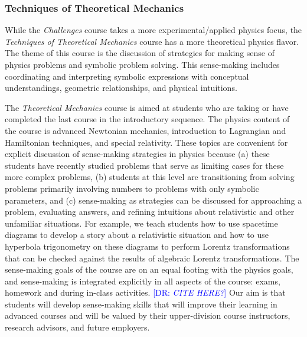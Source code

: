 \documentclass[english,aps,pra,reprint,noshowpacs,superscriptaddress]{revtex4-1}
\newcommand\davidsays[1]{\textcolor{blue}{[\sc DR: {\em#1}]}}
\begin{document}

\subsubsection{Techniques of Theoretical Mechanics}

While the \emph{Challenges} course takes a more experimental/applied physics
focus, the \emph{Techniques of Theoretical Mechanics} course has a more
theoretical physics flavor. The theme of this course is the discussion
of strategies for making sense of physics problems and symbolic
problem solving. This sense-making includes coordinating and
interpreting symbolic expressions with conceptual understandings,
geometric relationships, and physical intuitions.

The \emph{Theoretical Mechanics} course is aimed at students who are taking
or have completed the last course in the introductory sequence. The
physics content of the course is advanced Newtonian mechanics,
introduction to Lagrangian and Hamiltonian techniques, and special
relativity. These topics are convenient
for explicit discussion of sense-making strategies in physics because
(a) these students have recently studied problems that serve as limiting
cases for these more complex problems, (b) students at this level are
transitioning from solving problems primarily involving numbers to
problems with only symbolic parameters, and (c) sense-making as strategies 
can be discussed for approaching a problem, evaluating
answers, and refining intuitions about relativistic and other
unfamiliar situations. For example, we teach students how to use
spacetime diagrams to develop a story about a relativistic situation
and how to use hyperbola trigonometry on these diagrams to perform Lorentz
transformations that can be checked against the results of algebraic
Lorentz transformations.  The sense-making goals of the course are on
an equal footing with the physics goals, and sense-making is integrated
explicitly in all aspects of the course: exams, homework and during
in-class activities. \davidsays{CITE HERE?} Our aim is that students will develop
sense-making skills that will improve their learning in advanced
courses and will be valued by their upper-division course instructors,
research advisors, and future employers.
\end{document}
